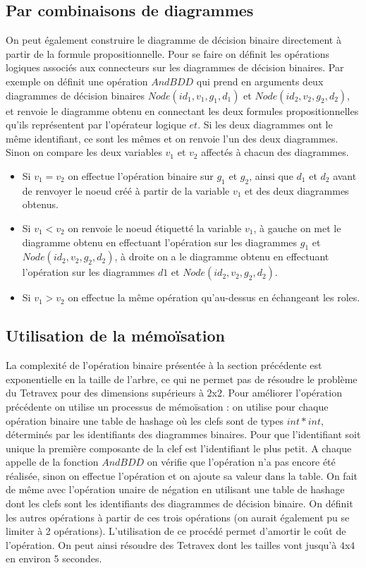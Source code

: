 \documentclass[11pt]{article}
\begin{document}
\subsection{Par combinaisons de diagrammes}
On peut également construire le diagramme de décision binaire directement à partir de la formule propositionnelle. Pour se faire on définit les opérations logiques associés aux connecteurs sur les diagrammes de décision binaires. Par exemple on définit une opération $AndBDD$ qui prend en arguments deux diagrammes de décision binaires $Node(id_1, v_1, g_1, d_1)$ et $Node(id_2, v_2, g_2, d_2)$, et renvoie le diagramme obtenu en connectant les deux formules propositionnelles qu'ils représentent par l'opérateur logique $et$. Si les deux diagrammes ont le même identifiant, ce sont les mêmes et on renvoie l'un des deux diagrammes. Sinon on compare les deux variables $v_1$ et $v_2$ affectés à chacun des diagrammes.
\begin{itemize}
\item Si $v_1 = v_2$ on effectue l'opération binaire sur $g_1$ et $g_2$, ainsi que $d_1$ et $d_2$ avant de renvoyer le noeud créé à partir de la variable $v_1$ et des deux diagrammes obtenus.
\item Si $v_1 < v_2$ on renvoie le noeud étiquetté la variable $v_1$, à gauche on met le diagramme obtenu en effectuant l'opération sur les diagrammes $g_1$ et $Node(id_2, v_2, g_2, d_2)$, à droite on a le diagramme obtenu en effectuant l'opération sur les diagrammes $d1$ et $Node(id_2, v_2, g_2, d_2)$.
\item Si $v_1 > v_2$ on effectue la même opération qu'au-dessus en échangeant les roles.
\end{itemize}
  
\subsection{Utilisation de la mémoïsation}
La complexité de l'opération binaire présentée à la section précédente est exponentielle en la taille de l'arbre, ce qui ne permet pas de résoudre le problème du Tetravex pour des dimensions supérieurs à $2$x$2$. Pour améliorer l'opération précédente on utilise un processus de mémoïsation : on utilise pour chaque opération binaire une table de hashage où les clefs sont de types $int * int$, déterminés par les identifiants des diagrammes binaires. Pour que l'identifiant soit unique la première composante de la clef est l'identifiant le plus petit. A chaque appelle de la fonction $AndBDD$ on vérifie que l'opération n'a pas encore été réalisée, sinon on effectue l'opération et on ajoute sa valeur dans la table. On fait de même avec l'opération unaire de négation en utilisant une table de hashage dont les clefs sont les identifiants des diagrammes de décision binaire. On définit les autres opérations à partir de ces trois opérations (on aurait également pu se limiter à 2 opérations). L'utilisation de ce procédé permet d'amortir le coût de l'opération. On peut ainsi résoudre des Tetravex dont les tailles vont jusqu'à $4$x$4$ en environ 5 secondes.
\end{document}
